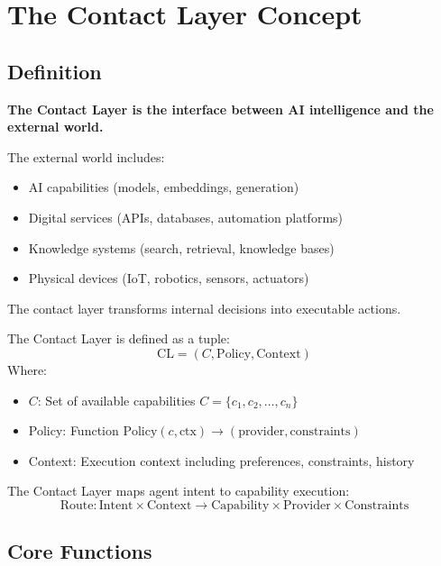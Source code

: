 \section{The Contact Layer Concept}

\subsection{Definition}

\textbf{The Contact Layer is the interface between AI intelligence and the external world.}

The external world includes:
\begin{itemize}[leftmargin=*]
\item AI capabilities (models, embeddings, generation)
\item Digital services (APIs, databases, automation platforms)
\item Knowledge systems (search, retrieval, knowledge bases)
\item Physical devices (IoT, robotics, sensors, actuators)
\end{itemize}

The contact layer transforms internal decisions into executable actions.

\begin{definition}
The Contact Layer is defined as a tuple:
\[
\text{CL} = (C, \text{Policy}, \text{Context})
\]
Where:
\begin{itemize}[leftmargin=*]
\item $C$: Set of available capabilities $C = \{c_1, c_2, \ldots, c_n\}$
\item Policy: Function $\text{Policy}(c, \text{ctx}) \to (\text{provider}, \text{constraints})$
\item Context: Execution context including preferences, constraints, history
\end{itemize}
The Contact Layer maps agent intent to capability execution:
\[
\text{Route}: \text{Intent} \times \text{Context} \to \text{Capability} \times \text{Provider} \times \text{Constraints}
\]
\end{definition}

\subsection{Core Functions}

